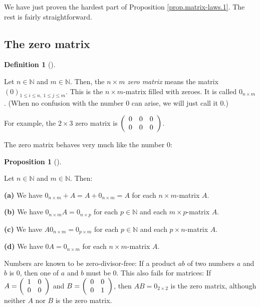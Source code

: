 \documentclass[numbers=enddot,12pt,final,onecolumn,notitlepage]{scrartcl}%
\theoremstyle{definition}
\newtheorem{prop}[theo]{Proposition}
\newenvironment{proposition}[1][]
{\begin{prop}[#1]\begin{leftbar}}
{\end{leftbar}\end{prop}}
\newtheorem{defi}[theo]{Definition}
\newenvironment{definition}[1][]
{\begin{defi}[#1]\begin{leftbar}}
{\end{leftbar}\end{defi}}
\begin{document}
We have just proven the hardest part of Proposition \ref{prop.matrix-laws.1}.
The rest is fairly straightforward.

\subsection{The zero matrix}

\begin{definition}
Let $n\in\mathbb{N}$ and $m\in\mathbb{N}$. Then, the $n\times m$\textit{ zero
matrix} means the matrix $\left(  0\right)  _{1\leq i\leq n,\ 1\leq j\leq m}$.
This is the $n\times m$-matrix filled with zeroes. It is called $0_{n\times
m}$. (When no confusion with the number $0$ can arise, we will just call it
$0$.)
\end{definition}

For example, the $2\times3$ zero matrix is $\left(
\begin{array}
[c]{ccc}%
0 & 0 & 0\\
0 & 0 & 0
\end{array}
\right)  $.

The zero matrix behaves very much like the number $0$:

\begin{proposition}
\label{prop.matrix-laws.0}Let $n\in\mathbb{N}$ and $m\in\mathbb{N}$. Then:

\textbf{(a)} We have $0_{n\times m}+A=A+0_{n\times m}=A$ for each $n\times
m$-matrix $A$.

\textbf{(b)} We have $0_{n\times m}A=0_{n\times p}$ for each $p\in\mathbb{N}$
and each $m\times p$-matrix $A$.

\textbf{(c)} We have $A0_{n\times m}=0_{p\times m}$ for each $p\in\mathbb{N}$
and each $p\times n$-matrix $A$.

\textbf{(d)} We have $0A=0_{n\times m}$ for each $n\times m$-matrix $A$.
\end{proposition}

Numbers are known to be zero-divisor-free: If a product $ab$ of two numbers
$a$ and $b$ is $0$, then one of $a$ and $b$ must be $0$. This also fails for
matrices: If $A=\left(
\begin{array}
[c]{cc}%
1 & 0\\
0 & 0
\end{array}
\right)  $ and $B=\left(
\begin{array}
[c]{cc}%
0 & 0\\
0 & 1
\end{array}
\right)  $, then $AB=0_{2\times2}$ is the zero matrix, although neither $A$
nor $B$ is the zero matrix.
\end{document}
